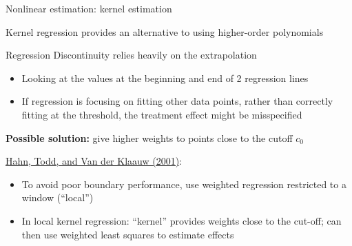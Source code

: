 \begin{frame}{Nonlinear estimation: kernel estimation}

Kernel regression provides an alternative to using higher-order polynomials

\vspace{3ex}
Regression Discontinuity relies heavily on the extrapolation 
\begin{itemize}
    \item Looking at the values at the beginning and end of 2 regression lines
    \item If regression is focusing on fitting other data points, rather than correctly fitting at the threshold, the treatment effect might be misspecified
\end{itemize}

\vspace{3ex}
\textbf{Possible solution:} give higher weights to points close to the cutoff $c_0$

\vspace{3ex}
\href{https://doi.org/10.1111/1468-0262.00183}{Hahn, Todd, and Van der Klaauw (2001)}: 
\begin{itemize}
    \item To avoid poor boundary performance, use weighted regression restricted to a window (``local'') 
    \item In local kernel regression: ``kernel'' provides weights close to the cut-off; can then use weighted least squares to estimate effects
\end{itemize}


\end{frame}



